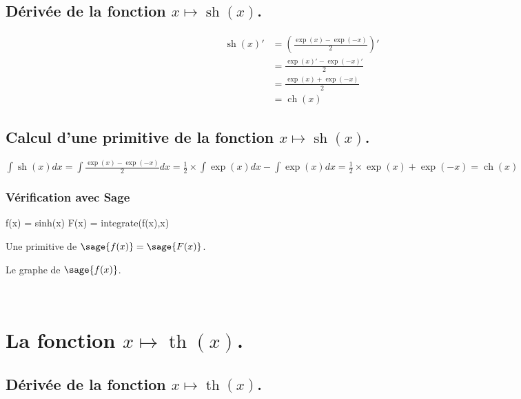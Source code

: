 \documentclass[a4paper,12pt]{report}
\renewcommand{\sinh}{\mathop{\mathrm{sh}}}
\renewcommand{\cosh}{\mathop{\mathrm{ch}}}
\renewcommand{\tanh}{\mathop{\mathrm{th}}}
\begin{document}
\subsection{Dérivée de la fonction $x \mapsto \sinh(x)$.}

\begin{align*}
\sinh(x)' & = \left( \frac{\exp(x)-\exp(-x)}{2} \right)' \\ 
& = \frac{\exp(x)'-\exp(-x)'}{2} \\
& = \frac{\exp(x)+\exp(-x)}{2} \\
& = \cosh(x)
\end{align*}





\subsection{Calcul d'une primitive de la fonction  $x \mapsto \sinh(x)$.}


$\int \sinh(x) dx = \int \frac{\exp(x)- \exp(-x)}{2} dx = \frac{1}{2} \times \int \exp(x) dx - \int \exp(x) dx = \frac{1}{2} \times \exp(x) + \exp(-x) = \cosh(x)$


\subsubsection{Vérification avec Sage}

\begin{sageblock}
    f(x) = sinh(x)
    F(x) = integrate(f(x),x)
\end{sageblock}


Une primitive de $\sage{f(x)} = \sage{F(x)} $.

Le graphe de $\sage{f(x)} $.


\begin{center}
 \\
\end{center}




\section{La fonction  $x \mapsto \tanh(x)$.}

\subsection{Dérivée de la fonction $x \mapsto \tanh(x)$.}
\end{document}
